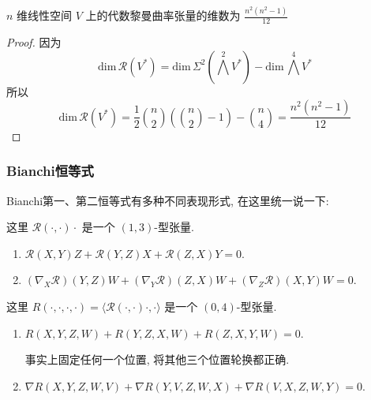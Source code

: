     \begin{proposition}
        $n$ 维线性空间 $V$ 上的代数黎曼曲率张量的维数为 $\displaystyle \frac{n^2(n^2-1)}{12}$
    \end{proposition}
    \begin{proof}
        因为
        \begin{equation*}
            \textstyle \mathrm{dim}\,\mathcal{R}(V^*) = \mathrm{dim}\,\Sigma^2(\bigwedge^2V^*) - \mathrm{dim}\,\bigwedge^4V^*
        \end{equation*}
        所以
        \begin{equation*}
            \mathrm{dim}\,\mathcal{R}(V^*) = \frac{1}{2}\binom{n}{2}\left(\binom{n}{2} - 1\right)-\binom{n}{4} = \frac{n^2(n^2-1)}{12}
        \end{equation*}
    \end{proof}

\subsubsection{Bianchi恒等式}
    Bianchi第一、第二恒等式有多种不同表现形式, 在这里统一说一下:
    \begin{proposition}[曲率算子形式的Bianchi恒等式]\hfill\par
        这里 $\mathcal{R}(\cdot,\cdot)\cdot$ 是一个 $(1,3)$-型张量.
        \begin{enumerate}
            \item $\mathcal{R}(X,Y)Z + \mathcal{R}(Y,Z)X + \mathcal{R}(Z,X)Y = 0$.
            \item $(\nabla_X\mathcal{R})(Y,Z)W + (\nabla_Y\mathcal{R})(Z,X)W + (\nabla_Z\mathcal{R})(X,Y)W = 0$.
        \end{enumerate}
    \end{proposition}

    \begin{proposition}[黎曼曲率张量形式的Bianchi恒等式]\hfill\par
        这里 $R(\cdot,\cdot,\cdot,\cdot) = \langle\mathcal{R}(\cdot,\cdot)\cdot,\cdot\rangle$ 是一个 $(0,4)$-型张量.
        \begin{enumerate}
            \item $R(X,Y,Z,W) + R(Y,Z,X,W) + R(Z,X,Y,W) = 0$.
            
            事实上固定任何一个位置, 将其他三个位置轮换都正确.
            \item $\nabla{R}(X,Y,Z,W,V) + \nabla{R}(Y,V,Z,W,X) + \nabla{R}(V,X,Z,W,Y) = 0$.
        \end{enumerate}
    \end{proposition}

